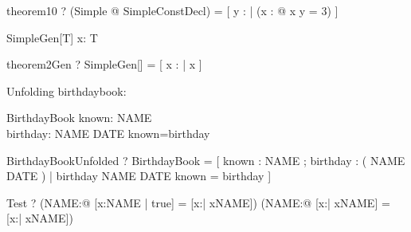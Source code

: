 \begin{theorem}{theorem10}
  \vdash? (\exists Simple @ SimpleConstDecl) =
    [ y : \arithmos | 
      (\exists x : \arithmos @ x \in \nat \land y = 3) ]
\end{theorem}


\begin{schema}{SimpleGen}[T]
  x: T
\end{schema}

\begin{theorem}{theorem2Gen}
  \vdash? SimpleGen[\nat] =
    [ x : \arithmos | x \in \nat ]
\end{theorem}




Unfolding birthdaybook:

\begin{zed}\end{zed}

\begin{schema}{BirthdayBook}
    known: \power NAME \\
    birthday: NAME \pfun DATE
\where
    known=\dom birthday
\end{schema}

\begin{theorem}{BirthdayBookUnfolded}
  \vdash? BirthdayBook =
    [ known : \power NAME ; birthday : \power ( NAME \cross DATE )
    | birthday \in NAME \pfun DATE \land known = \dom birthday ]
\end{theorem}

\begin{theorem}{Test}
  \vdash? (\exists NAME:\power\arithmos @ [x:NAME | true] =
                                          [x:\arithmos | x\in NAME])
          \iff
          (\exists NAME:\power\arithmos @ [x:\arithmos | x\in NAME] =
                                          [x:\arithmos | x\in NAME])
\end{theorem}
